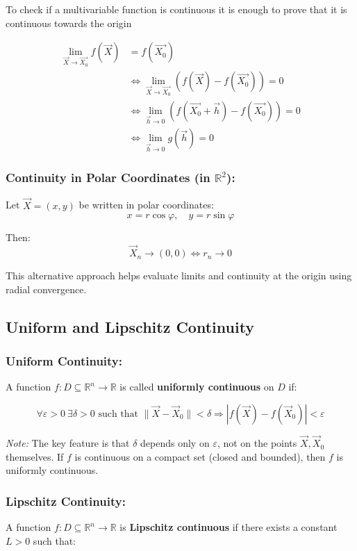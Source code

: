 To check if a multivariable function is continuous it is enough to prove that it is continuous towards the origin

\begin{align*}
    \lim_{\vec{X} \to \vec{X_0}}f(\vec{X}) &= f(\vec{X_0}) \\
    &\iff \lim_{\vec{X} \to \vec{X_0}} \left(f(\vec{X}) - f(\vec{X_0})\right) = 0 \\
    &\iff \lim_{\vec{h} \to 0} \left(f(\vec{X_0} + \vec{h}) - f(\vec{X_0})\right) = 0 \\
    &\iff \lim_{\vec{h} \to 0} g(\vec{h}) = 0
\end{align*}

\subsubsection{Continuity in Polar Coordinates (in \( \mathbb{R}^2 \)):}

Let \( \vec{X} = (x, y) \) be written in polar coordinates:
\[
x = r \cos \varphi, \quad y = r \sin \varphi
\]

Then:
\[
\vec{X}_n \to (0, 0) \iff r_n \to 0
\]

This alternative approach helps evaluate limits and continuity at the origin using radial convergence.

\subsection{Uniform and Lipschitz Continuity}

\subsubsection{Uniform Continuity:}  
A function \( f : D \subseteq \mathbb{R}^n \to \mathbb{R} \) is called \textbf{uniformly continuous} on \( D \) if:

\[
\forall \varepsilon > 0 \ \exists \delta > 0 \text{ such that } \|\vec{X} - \vec{X}_0\| < \delta \Rightarrow |f(\vec{X}) - f(\vec{X}_0)| < \varepsilon
\]

\textit{Note:} The key feature is that \( \delta \) depends only on \( \varepsilon \), not on the points \( \vec{X}, \vec{X}_0 \) themselves.  
If \( f \) is continuous on a compact set (closed and bounded), then \( f \) is uniformly continuous.

\subsubsection{Lipschitz Continuity:}  
A function \( f : D \subseteq \mathbb{R}^n \to \mathbb{R} \) is \textbf{Lipschitz continuous} if there exists a constant \( L > 0 \) such that:

